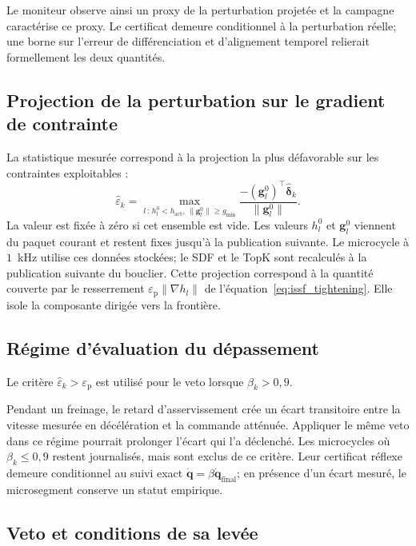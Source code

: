 Le moniteur observe ainsi un proxy de la perturbation projetée et la campagne caractérise ce proxy. Le certificat demeure conditionnel à la perturbation réelle; une borne sur l'erreur de différenciation et d'alignement temporel relierait formellement les deux quantités.

\subsection*{Projection de la perturbation sur le gradient de contrainte}

La statistique mesurée correspond à la projection la plus défavorable sur les contraintes exploitables :
\begin{equation}\label{eq:eps_projete}
\hat{\varepsilon}_k
=\max_{l\,:\,h_l^0<h_{\mathrm{act}},\,
\|\mathbf g_l^0\|\geq g_{\min}}
\frac{-(\mathbf g_l^0)^{\top}\widehat{\boldsymbol\delta}_k}
{\|\mathbf g_l^0\|}.
\end{equation}
La valeur est fixée à zéro si cet ensemble est vide. Les valeurs $h_l^0$ et $\mathbf g_l^0$ viennent du paquet courant et restent fixes jusqu'à la publication suivante. Le microcycle à $1$~kHz utilise ces données stockées; le \ac{SDF} et le TopK sont recalculés à la publication suivante du bouclier. Cette projection correspond à la quantité couverte par le resserrement $\varepsilon_{\mathrm p}\|\nabla h_l\|$ de l'équation~\eqref{eq:issf_tightening}. Elle isole la composante dirigée vers la frontière.

\subsection*{Régime d'évaluation du dépassement}

Le critère $\hat{\varepsilon}_k>\varepsilon_{\mathrm p}$ est utilisé pour le veto lorsque $\beta_k>0{,}9$.

Pendant un freinage, le retard d'asservissement crée un écart transitoire entre la vitesse mesurée en décélération et la commande atténuée. Appliquer le même veto dans ce régime pourrait prolonger l'écart qui l'a déclenché. Les microcycles où $\beta_k\leq0{,}9$ restent journalisés, mais sont exclus de ce critère. Leur certificat réflexe demeure conditionnel au suivi exact $\dot{\mathbf q}=\beta\dot{\mathbf q}_{\mathrm{final}}$; en présence d'un écart mesuré, le microsegment conserve un statut empirique.

\subsection*{Veto et conditions de sa levée}

